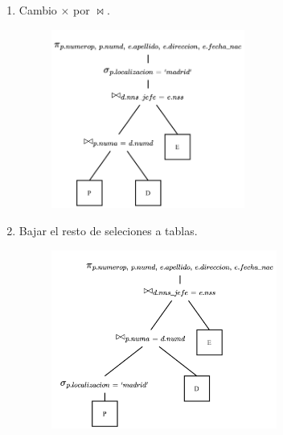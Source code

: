 \documentclass{templateNote}
\begin{document}
\begin{enumerate}
\begin{itemize}
\begin{enumerate}
            \item Cambio $\times$ por $\Join$.
            \begin{figure}[H]
                \centering
                \includegraphics[width=0.6\textwidth]{img/E4-Paso-4.png}
            \end{figure}

            \newpage
            \item Bajar el resto de seleciones a tablas.
            \begin{figure}[H]
                \centering
                \includegraphics[width=0.7\textwidth]{img/E4-Paso-5.png}
            \end{figure}


\end{enumerate}
\end{itemize}
\end{enumerate}
\end{document}

